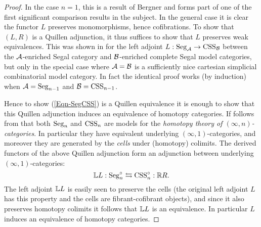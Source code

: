 \documentclass[a4paper]{amsart}
\begin{document}
\begin{proof}
	In the case $n=1$, this is a result of Bergner \cite[Thm 6.3]{MR2321038} and forms part of one of the first significant comparison results in the subject. In the general case it is clear the functor $L$ preserves monomorphisms, hence cofibrations. To show that $(L,R)$ is a Quillen adjunction, it thus suffices to show that $L$ preserves weak equivalences. This was shown in \cite[Lem. 2.3.13]{0905.0462} for the left adjoint $L: \mathrm{Seg}_{\mathcal A} \to \mathrm{CSS}_{\mathcal B}$ between the $\mathcal A$-enriched Segal category and $\mathcal B$-enriched complete Segal model categories, but only in the special case where $\mathcal A = \mathcal B$ is a sufficiently nice cartesian simplicial combinatorial model category. In fact the identical proof works (by induction) when $\mathcal A = \mathrm{Seg}_{n-1}$ and $\mathcal B= \mathrm{CSS}_{n-1}$.  
	
	Hence to show (\ref{Eqn-SegCSS}) is a Quillen equivalence it is enough to show that this Quillen adjunction induces an equivalence of homotopy categories. 
	If follows from \cite[Thm. 12.6, Ex. 13.8]{1112.0040} that both $\mathrm{Seg}_n$ and $\mathrm{CSS}_n$ are models for the {\em homotopy theory of $(\infty,n)$-categories}. In particular they have equivalent underlying  $(\infty,1)$-categories, and moreover they are generated by the {\em cells} under (homotopy) colimits. The derived functors of the above Quillen adjunction form an adjunction between underlying $(\infty,1)$-categories:
	\begin{equation*}
		\mathbb L L : \mathrm{Seg}_n^{\circ} \leftrightarrows \mathrm{CSS}_n^{\circ}: \mathbb R R.
	\end{equation*} 
The left adjoint $\mathbb L L$ is easily seen to preserve the {cells} (the original left adjoint $L$ has this property and the cells are fibrant-cofibrant objects), and since it also preserves homotopy colimits it follows that $\mathbb L L$ is an equivalence. In particular $L$ induces an equivalence of homotopy categories. 	
\end{proof}
\end{document}

